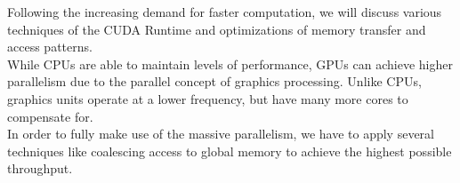 Following the increasing demand for faster computation, 
we will discuss various techniques of the CUDA Runtime and optimizations of memory transfer and access patterns.\\
While CPUs are able to maintain levels of performance,
GPUs can achieve higher parallelism due to the parallel concept of graphics processing.
Unlike CPUs, graphics units operate at a lower frequency, but have many more cores to compensate for.\\
In order to fully make use of the massive parallelism, we have to apply several techniques like coalescing access to global memory to achieve the highest possible throughput.\\
